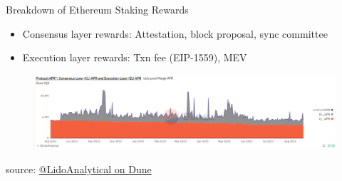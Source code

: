 \documentclass{beamer}
\begin{document}
\begin{frame}{Breakdown of Ethereum Staking Rewards}
\begin{itemize}
    \item Consensus layer rewards: Attestation, block proposal, sync committee
    \item Execution layer rewards: Txn fee (EIP-1559), MEV
\end{itemize}
\begin{figure}
    \centering
    \includegraphics[width=\textwidth]{figures/lido_apr.png}
\end{figure}
\tiny{source: \href{https://dune.com/LidoAnalytical/lido-execution-layer-rewards}{@LidoAnalytical on Dune}}

\end{frame}
\end{document}
